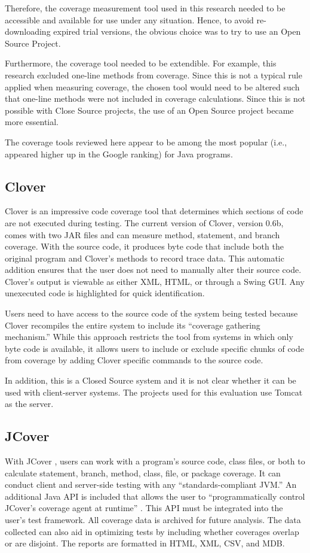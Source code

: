 Therefore, the coverage measurement tool used in this research needed to be
accessible and available for use under any situation.  Hence, to avoid
re-downloading expired trial versions, the obvious choice was to try to use
an Open Source Project.

Furthermore, the coverage tool needed to be extendible.  For example, this
research excluded one-line methods from coverage.  Since this is not a
typical rule applied when measuring coverage, the chosen tool would need to
be altered such that one-line methods were not included in coverage
calculations.  Since this is not possible with Close Source projects, the
use of an Open Source project became more essential.

The coverage tools reviewed here appear to be among the most popular (i.e.,
appeared higher up in the Google \cite{Google} ranking) for Java programs.

\subsection{Clover}
Clover \cite{Clover} is an impressive code coverage tool that determines
which sections of code are not executed during testing. The current version
of Clover, version 0.6b, comes with two JAR files and can measure method,
statement, and branch coverage.  With the source code, it produces byte
code that include both the original program and Clover's methods to record
trace data. This automatic addition ensures that the user does not need to
manually alter their source code. Clover's output is viewable as either
XML, HTML, or through a Swing GUI. Any unexecuted code is highlighted for
quick identification.

Users need to have access to the source code of the system being tested
because Clover recompiles the entire system to include its ``coverage
gathering mechanism.''  While this approach restricts the tool from systems
in which only byte code is available, it allows users to include or exclude
specific chunks of code from coverage by adding Clover specific commands to
the source code.

In addition, this is a Closed Source system and it is not clear whether it
can be used with client-server systems. The projects used for this
evaluation use Tomcat as the server.

\subsection{JCover \texttrademark}
With JCover \cite{JCover}, users can work with a program's source code,
class files, or both to calculate statement, branch, method, class, file,
or package coverage. It can conduct client and server-side testing with any
``standards-compliant JVM.'' An additional Java API is included that allows
the user to ``programmatically control JCover's coverage agent at runtime''
\cite{JCover}. This API must be integrated into the user's test
framework. All coverage data is archived for future analysis. The data
collected can also aid in optimizing tests by including whether coverages
overlap or are disjoint. The reports are formatted in HTML, XML, CSV, and
MDB.

